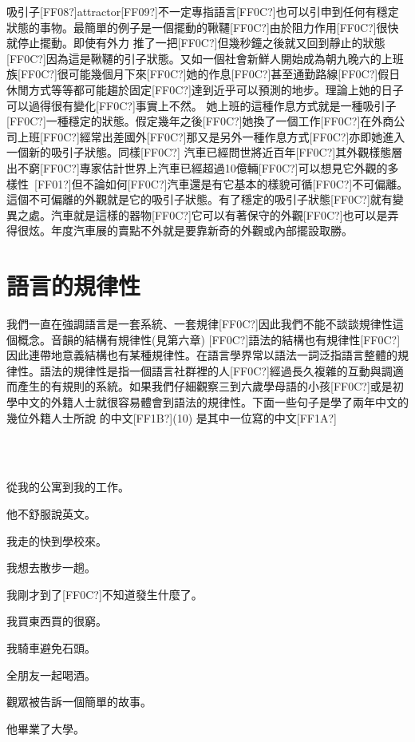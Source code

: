 吸引子[FF08?]attractor[FF09?]不一定專指語言[FF0C?]也可以引申到任何有穩定狀態的事物。最簡單的例子是一個擺動的鞦韆[FF0C?]由於阻力作用[FF0C?]很快就停止擺動。即使有外力 推了一把[FF0C?]但幾秒鐘之後就又回到靜止的狀態[FF0C?]因為這是鞦韆的引子狀態。又如一個社會新鮮人開始成為朝九晚六的上班族[FF0C?]很可能幾個月下來[FF0C?]她的作息[FF0C?]甚至通勤路線[FF0C?]假日休閒方式等等都可能趨於固定[FF0C?]達到近乎可以預測的地步。理論上她的日子可以過得很有變化[FF0C?]事實上不然。 她上班的這種作息方式就是一種吸引子[FF0C?]一種穩定的狀態。假定幾年之後[FF0C?]她換了一個工作[FF0C?]在外商公司上班[FF0C?]經常出差國外[FF0C?]那又是另外一種作息方式[FF0C?]亦即她進入一個新的吸引子狀態。同樣[FF0C?] 汽車已經問世將近百年[FF0C?]其外觀樣態層出不窮[FF0C?]專家估計世界上汽車已經超過10億輛[FF0C?]可以想見它外觀的多樣性~[FF01?]但不論如何[FF0C?]汽車還是有它基本的樣貌可循[FF0C?]不可偏離。這個不可偏離的外觀就是它的吸引子狀態。有了穩定的吸引子狀態[FF0C?]就有變異之處。汽車就是這樣的器物[FF0C?]它可以有著保守的外觀[FF0C?]也可以是弄得很炫。年度汽車展的賣點不外就是要靠新奇的外觀或內部擺設取勝。   

\section{語言的規律性} 

我們一直在強調語言是一套系統、一套規律[FF0C?]因此我們不能不談談規律性這個概念。音韻的結構有規律性(見第六章) [FF0C?]語法的結構也有規律性[FF0C?]因此連帶地意義結構也有某種規律性。在語言學界常以語法一詞泛指語言整體的規律性。語法的規律性是指一個語言社群裡的人[FF0C?]經過長久複雜的互動與調適而產生的有規則的系統。如果我們仔細觀察三到六歲學母語的小孩[FF0C?]或是初學中文的外籍人士就很容易體會到語法的規律性。下面一些句子是學了兩年中文的幾位外籍人士所說 的中文[FF1B?](10) 是其中一位寫的中文[FF1A?] 

\ea%
\label{ex:key:9}
\gll\\
\\
\glt
\z

從我的公寓到我的工作。

他不舒服說英文。

我走的快到學校來。

我想去散步一趟。

我剛才到了[FF0C?]不知道發生什麼了。

我買東西買的很窮。

我騎車避免石頭。

全朋友一起喝酒。

觀眾被告訴一個簡單的故事。

他畢業了大學。

